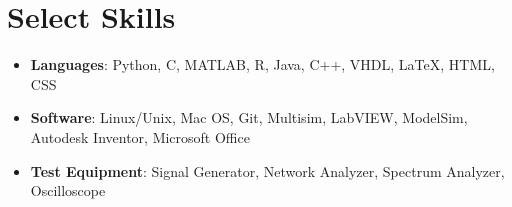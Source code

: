 \documentclass[letterpaper,11pt]{article}
\newcommand{\resumeItem}[2]{
  \item\small{
    \textbf{#1}{: #2 \vspace{-2pt}}
  }
}
\newcommand{\resumeSubItem}[2]{\resumeItem{#1}{#2}\vspace{-4pt}}
\newcommand{\resumeSubHeadingListStart}{\begin{itemize}[leftmargin=*]}
\newcommand{\resumeSubHeadingListEnd}{\end{itemize}}
\begin{document}
%
\section{Select Skills}
  \resumeSubHeadingListStart
  \resumeSubItem{Languages}
      {Python, C, MATLAB, R, Java, C++, VHDL, LaTeX, HTML, CSS}
    \resumeSubItem{Software}
      {Linux/Unix, Mac OS, Git, Multisim, LabVIEW, ModelSim, Autodesk Inventor, Microsoft Office}
    \resumeSubItem{Test Equipment}
      {Signal Generator, Network Analyzer, Spectrum Analyzer, Oscilloscope}
  \resumeSubHeadingListEnd


\end{document}
